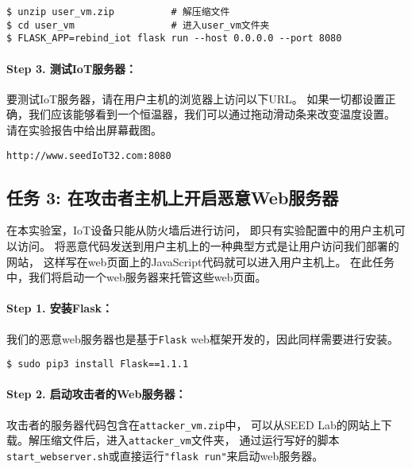\begin{lstlisting}
$ unzip user_vm.zip          # 解压缩文件
$ cd user_vm                 # 进入user_vm文件夹
$ FLASK_APP=rebind_iot flask run --host 0.0.0.0 --port 8080
\end{lstlisting}
 

\paragraph{Step 3. 测试IoT服务器：}

要测试IoT服务器，请在用户主机的浏览器上访问以下URL。
如果一切都设置正确，我们应该能够看到一个恒温器，我们可以通过拖动滑动条来改变温度设置。
请在实验报告中给出屏幕截图。

\begin{lstlisting}
http://www.seedIoT32.com:8080
\end{lstlisting}



\subsection{任务 3: 在攻击者主机上开启恶意Web服务器}

在本实验室，IoT设备只能从防火墙后进行访问，
即只有实验配置中的用户主机可以访问。
将恶意代码发送到用户主机上的一种典型方式是让用户访问我们部署的网站，
这样写在web页面上的JavaScript代码就可以进入用户主机上。
在此任务中，我们将启动一个web服务器来托管这些web页面。


\paragraph{Step 1. 安装Flask：}

我们的恶意web服务器也是基于\texttt{Flask} web框架开发的，因此同样需要进行安装。


\begin{lstlisting}
$ sudo pip3 install Flask==1.1.1
\end{lstlisting}


\paragraph{Step 2. 启动攻击者的Web服务器：}
攻击者的服务器代码包含在\texttt{attacker\_vm.zip}中，
可以从SEED Lab的网站上下载。解压缩文件后，进入\texttt{attacker\_vm}文件夹，
通过运行写好的脚本\texttt{start\_webserver.sh}或直接运行\texttt{"flask run"}来启动web服务器。



